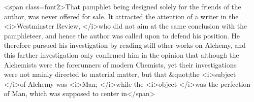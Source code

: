<span class=font2>That pamphlet being designed solely for the friends of the author, was
never offered for sale. It attracted the attention of a writer in the
<i>Westminster Review, </i>who did not aim at the same conclusion with
the pamphleteer, and hence the author was called upon to defend his
position. He therefore pursued his investigation by reading still
other works on Alchemy, and this farther investigation only confirmed
him in the opinion that although the Alchemists were the forerunners
of modern Chemists, yet their investigations were not mainly directed
to material matter, but that &quot;the <i>subject </i>of Alchemy was <i>Man; </i>while
the <i>object </i>was the perfection of Man, which was supposed to center in</span>
